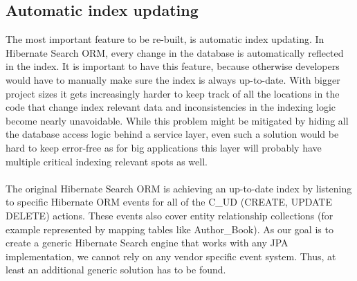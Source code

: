 \subsection{Automatic index updating} \label{automatic_indexing_problematic_intro}
The most important feature to be re-built, is automatic index updating. In Hibernate Search ORM, every change in the database is automatically reflected in the index. It is important to have this feature, because otherwise developers would have to manually make sure the index is always up-to-date. With bigger project sizes it gets increasingly harder to keep track of all the locations in the code that change index relevant data and inconsistencies in the indexing logic become nearly unavoidable. While this problem might be mitigated by hiding all the database access logic behind a service layer, even such a solution would be hard to keep error-free as for big applications this layer will probably have multiple critical indexing relevant spots as well.
\\\\
The original Hibernate Search ORM is achieving an up-to-date index by listening to specific Hibernate ORM events for all of the C\_UD (CREATE, UPDATE DELETE) actions. These events also cover entity relationship collections (for example represented by mapping tables like Author\_Book). As our goal is to create a generic Hibernate Search engine that works with any JPA implementation, we cannot rely on any vendor specific event system. Thus, at least an additional generic solution has to be found.

\pagebreak